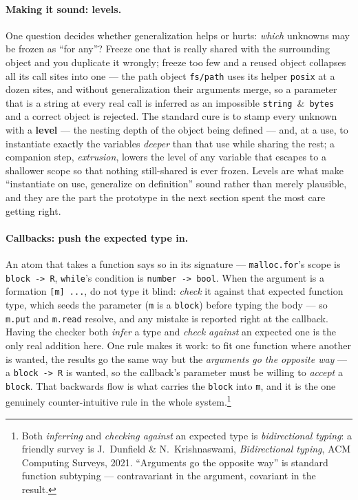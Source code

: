 \documentclass[10pt]{article}
\begin{document}
\paragraph{Making it sound: levels.} One question decides whether generalization
helps or hurts: \emph{which} unknowns may be frozen as ``for any''? Freeze one
that is really shared with the surrounding object and you duplicate it wrongly;
freeze too few and a reused object collapses all its call sites into one --- the
path object \verb|fs/path| uses its helper \verb|posix| at a dozen sites, and
without generalization their arguments merge, so a parameter that is a string at
every real call is inferred as an impossible \verb|string|~\&~\verb|bytes| and a
correct object is rejected. The standard cure is to stamp every unknown with a
\textbf{level} --- the nesting depth of the object being defined --- and, at a
use, to instantiate exactly the variables \emph{deeper} than that use while
sharing the rest; a companion step, \emph{extrusion}, lowers the level of any
variable that escapes to a shallower scope so that nothing still-shared is ever
frozen. Levels are what make ``instantiate on use, generalize on definition''
sound rather than merely plausible, and they are the part the prototype in the
next section spent the most care getting right.

\paragraph{Callbacks: push the expected type in.} An atom that takes a function
says so in its signature --- \verb|malloc.for|'s scope is \verb|block -> R|,
\verb|while|'s condition is \verb|number -> bool|. When the argument is a
formation \verb|[m] ...|, do not type it blind: \emph{check} it against that
expected function type, which seeds the parameter (\verb|m| is a \verb|block|)
before typing the body --- so \verb|m.put| and \verb|m.read| resolve, and any
mistake is reported right at the callback. Having the checker both \emph{infer}
a type and \emph{check against} an expected one is the only real addition here.
One rule makes it work: to fit one function where another is wanted, the results
go the same way but the \emph{arguments go the opposite way} --- a
\verb|block -> R| is wanted, so the callback's parameter must be willing to
\emph{accept} a \verb|block|. That backwards flow is what carries the
\verb|block| into \verb|m|, and it is the one genuinely counter-intuitive rule
in the whole system.\footnote{Both \emph{inferring} and \emph{checking against}
an expected type is \emph{bidirectional typing}: a friendly survey is
J.~Dunfield \& N.~Krishnaswami, \emph{Bidirectional typing}, ACM Computing
Surveys, 2021. ``Arguments go the opposite way'' is standard function subtyping
--- contravariant in the argument, covariant in the result.}
\end{document}
